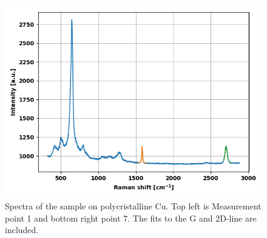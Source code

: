 \documentclass[12pt,a4paper]{article}
\begin{document}
\begin{figure}
\includegraphics[scale=0.5]{Bilder/part6/7.png}
\caption{Spectra of the sample on polycristalline Cu. Top left is Measurement point 1 and bottom right point 7. The fits to the G and 2D-line are included.}
\label{fig:appendix_6}
\end{figure}
\end{document}
